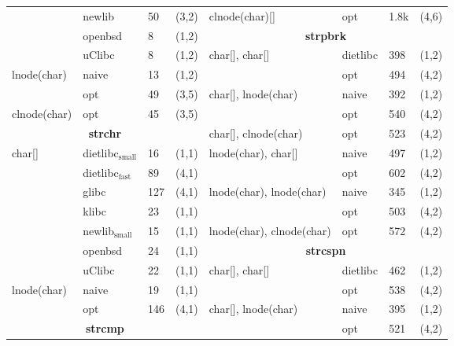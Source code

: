 \begin{figure}[t]
\begin{scriptsize}
\begin{tabular}{lllclllc}
       & newlib & 50 & (3,2) &                                              clnode(char)[] & opt & 1.8k & (4,6) \\
       & openbsd & 8 & (1,2) &                                                \multicolumn{4}{c}{\bf strpbrk} \\ 
       & uClibc & 8 & (1,2) &                                                 char[], char[] & dietlibc & 398 & (1,2) \\
lnode(char) & naive & 13 & (1,2) &                                                          & opt      & 494 & (4,2) \\
            & opt & 49 & (3,5) &                                              char[], lnode(char) & naive & 392 & (1,2) \\
clnode(char) & opt & 45 & (3,5) &                                                                & opt & 540 & (4,2) \\ 
 \multicolumn{4}{c}{\bf strchr} &                                                 char[], clnode(char) & opt & 523 & (4,2) \\
char[] & dietlibc$\mathrm{_{small}}$ & 16 & (1,1) &                           lnode(char), char[] & naive & 497 & (1,2) \\
       & dietlibc$\mathrm{_{fast}}$ & 89 & (4,1) &                                               & opt & 602 & (4,2) \\ 
       & glibc & 127 & (4,1) &                                                lnode(char), lnode(char) & naive & 345 & (1,2) \\
       & klibc & 23 & (1,1) &                                                                           & opt & 503 & (4,2) \\
       & newlib$\mathrm{_{small}}$ & 15 & (1,1) &                         lnode(char), clnode(char) & opt & 572 & (4,2) \\
       & openbsd & 24 & (1,1) &                                             \multicolumn{4}{c}{\bf strcspn} \\
       & uClibc & 22 & (1,1) &                                              char[], char[] & dietlibc & 462 & (1,2) \\ 
lnode(char) & naive & 19 & (1,1) &                                                        & opt      & 538 & (4,2) \\ 
            & opt & 146 & (4,1) &                                           char[], lnode(char) & naive & 395 & (1,2) \\
\multicolumn{4}{c}{\bf strcmp}   &                                     & opt & 521 & (4,2) \\

\end{tabular}
\end{scriptsize}
\end{figure}
